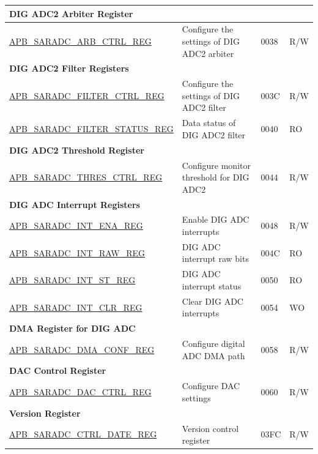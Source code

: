\begin{longtable}{ | p{6cm} | p{7.2cm} | p{1.3cm} | p{1cm} | }
\multicolumn{4}{|l|}{\textbf{DIG ADC2 Arbiter Register}} \\ \hline
\hyperref[regdesc:APBSARADCARBCTRLREG]{APB\_SARADC\_ARB\_CTRL\_REG} & Configure the settings of DIG ADC2 arbiter & \hexprefix{}0038 & R/W \\ \hline
\multicolumn{4}{|l|}{\textbf{DIG ADC2 Filter Registers}} \\ \hline
\hyperref[regdesc:APBSARADCFILTERCTRLREG]{APB\_SARADC\_FILTER\_CTRL\_REG} & Configure the settings of DIG ADC2 filter & \hexprefix{}003C & R/W \\ \hline
\hyperref[regdesc:APBSARADCFILTERSTATUSREG]{APB\_SARADC\_FILTER\_STATUS\_REG} & Data status of DIG ADC2 filter & \hexprefix{}0040 & RO \\ \hline
\multicolumn{4}{|l|}{\textbf{DIG ADC2 Threshold Register}} \\ \hline
\hyperref[regdesc:APBSARADCTHRESCTRLREG]{APB\_SARADC\_THRES\_CTRL\_REG} & Configure monitor threshold for DIG ADC2 & \hexprefix{}0044 & R/W \\ \hline
\multicolumn{4}{|l|}{\textbf{DIG ADC Interrupt Registers}} \\ \hline
\hyperref[regdesc:APBSARADCINTENAREG]{APB\_SARADC\_INT\_ENA\_REG} & Enable DIG ADC interrupts & \hexprefix{}0048 & R/W \\ \hline
\hyperref[regdesc:APBSARADCINTRAWREG]{APB\_SARADC\_INT\_RAW\_REG} & DIG ADC interrupt raw bits & \hexprefix{}004C & RO \\ \hline
\hyperref[regdesc:APBSARADCINTSTREG]{APB\_SARADC\_INT\_ST\_REG} & DIG ADC interrupt status & \hexprefix{}0050 & RO \\ \hline
\hyperref[regdesc:APBSARADCINTCLRREG]{APB\_SARADC\_INT\_CLR\_REG} & Clear DIG ADC interrupts & \hexprefix{}0054 & WO \\ \hline
\multicolumn{4}{|l|}{\textbf{DMA Register for DIG ADC}} \\ \hline
\hyperref[regdesc:APBSARADCDMACONFREG]{APB\_SARADC\_DMA\_CONF\_REG} & Configure digital ADC DMA path & \hexprefix{}0058 & R/W \\ \hline
\multicolumn{4}{|l|}{\textbf{DAC Control Register}} \\ \hline
\hyperref[regdesc:APBSARADCAPBDACCTRLREG]{APB\_SARADC\_DAC\_CTRL\_REG} & Configure DAC settings & \hexprefix{}0060 & R/W \\ \hline
\multicolumn{4}{|l|}{\textbf{Version Register}} \\ \hline
\hyperref[regdesc:APBSARADCAPBCTRLDATEREG]{APB\_SARADC\_CTRL\_DATE\_REG} & Version control register & \hexprefix{}03FC & R/W \\ \hline
\end{longtable}
